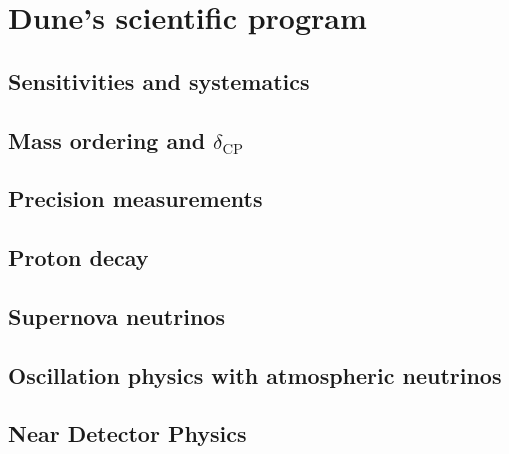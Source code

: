 \section{Dune's scientific program}
\subsection{Sensitivities and systematics}
\subsection{Mass ordering and $\delta_\textrm{CP}$}
\subsection{Precision measurements}
\subsection{Proton decay}
\subsection{Supernova neutrinos}
\subsection{Oscillation physics with atmospheric neutrinos}
\subsection{Near Detector Physics}
